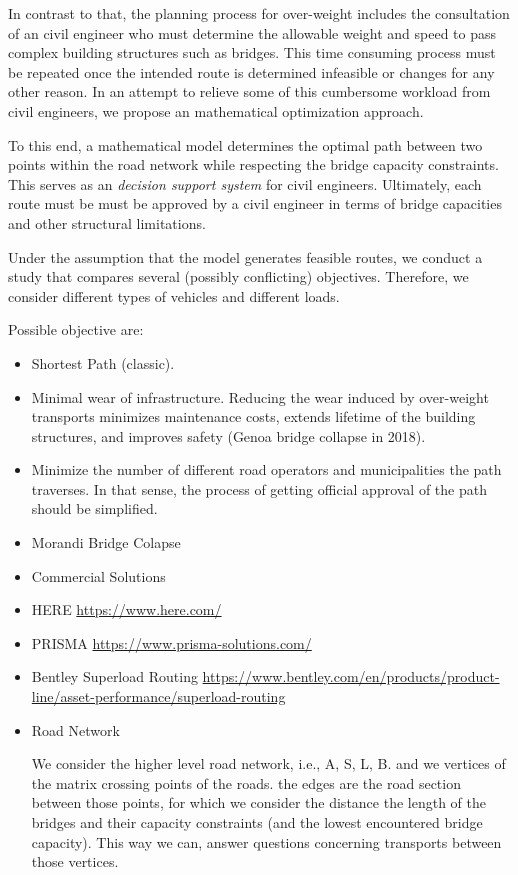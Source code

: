 In contrast to that, the planning process for over-weight includes the consultation
of an civil engineer who must determine the allowable weight and speed to pass
complex building structures such as bridges.
This time consuming process must be repeated once the intended route is determined infeasible or changes for any other reason.
In an attempt to relieve some of this cumbersome workload from civil engineers,
we propose an mathematical optimization approach.

To this end, a mathematical model determines the optimal path between two
points within the road network while respecting the bridge capacity constraints.
This serves as an \textit{decision support system} for civil engineers.
Ultimately,  each route must be must be approved by a civil engineer  in terms of
bridge capacities and other structural limitations.

Under the assumption that the model generates feasible routes,
we conduct a study that compares several (possibly conflicting) objectives.
Therefore, we consider different types of vehicles and different loads.

Possible objective are:
\begin{itemize}
  \item Shortest Path (classic).

  \item Minimal wear of infrastructure. Reducing the wear induced by over-weight transports
  minimizes maintenance costs, extends lifetime of the building structures, and
  improves safety (Genoa bridge collapse in 2018).

  \item Minimize the number of different road operators and municipalities the path
  traverses. In that sense, the process of getting official approval of the
  path should be simplified.
\end{itemize}

\begin{itemize}
\item Morandi Bridge Colapse

\cite{Morgese.2020}
\cite{MorandiNYTimes}


\item Commercial Solutions

\item HERE
\url{https://www.here.com/}
\item PRISMA
\url{https://www.prisma-solutions.com/}

\item Bentley Superload Routing
\url{https://www.bentley.com/en/products/product-line/asset-performance/superload-routing}



\item Road Network

We consider the higher level road network, i.e., A, S, L, B.
and we vertices of the matrix crossing points of the roads.
the edges are the road section between those points, for which we
consider the distance the length of the bridges and their capacity constraints (and the lowest encountered bridge capacity).
This way we can, answer questions concerning transports between those vertices.
\end{itemize}

